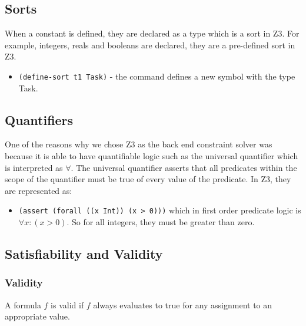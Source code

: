 \documentclass[a4paper]{report}
\begin{document}
\subsection{Sorts}
When a constant is defined, they are declared as a type which is a sort in Z3. For example, integers, reals and booleans are declared, they are a pre-defined sort in Z3. 
\begin{itemize}
\item \texttt{(define-sort t1 Task)} - the command defines a new symbol with the type Task.
\end{itemize}

\subsection{Quantifiers}
One of the reasons why we chose Z3 as the back end constraint solver was because it is able to have quantifiable logic such as the universal quantifier which is interpreted as  $\forall$. The universal quantifier asserts that all predicates within the scope of the quantifier must be true of every value of the predicate. In Z3, they are represented as:
\begin{itemize}
\item \texttt{(assert (forall ((x Int)) (x > 0)))} which in first order predicate logic is $\forall x: (x > 0)$. So for all integers, they must be greater than zero.
\end{itemize}

\subsection{Satisfiability and Validity}
\subsubsection{Validity}
A formula $f$ is valid if $f$ always evaluates to true for any assignment to an appropriate value. 
\end{document}

